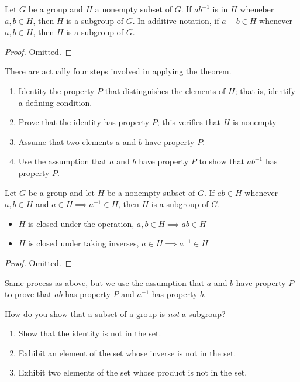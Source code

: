 \documentclass[12pt]{scrartcl}
\begin{document}
\begin{theorem}
  Let $G$ be a group and $H$ a nonempty subset of $G$. If $ab^{-1}$ is in $H$ wheneber $a, b \in H$, then $H$ is a subgroup 
  of $G$. In additive notation, if $a - b \in H$ whenever $a, b \in H$, then $H$ is a subgroup of $G$. 
  \begin{proof}
    Omitted.
  \end{proof} 
  There are actually four steps involved in applying the theorem. 
  \begin{enumerate}
    \item Identity the property $P$ that distinguishes the elements of $H$; that is, identify a defining condition. 
    \item Prove that the identity has property $P$; this verifies that $H$ is nonempty
    \item Assume that two elements $a$ and $b$ have property $P$. 
    \item Use the assumption that $a$ and $b$ have property $P$ to show that $ab^{-1}$ has property $P$. 
  \end{enumerate} 
\end{theorem}

\begin{theorem}
  Let $G$ be a group and let $H$ be a nonempty subset of $G$. If $ab \in H$ whenever $a, b \in H$
  and $a \in H \implies a^{-1} \in H$, then $H$ is a subgroup of $G$. 
  \begin{itemize}
    \item $H$ is closed under the operation, $a, b \in H \implies ab \in H$
    \item $H$ is closed under taking inverses, $a \in H \implies a^{-1} \in H$
  \end{itemize} 
  \begin{proof}
    Omitted.
  \end{proof}
  Same process as above, but we use the assumption that $a$ and $b$ have property $P$ to prove that $ab$ has property $P$ and $a^{-1}$ has property $b$. 
\end{theorem}

\begin{note}
How do you show that a subset of a group is \textit{not} a subgroup?
\begin{enumerate}
  \item Show that the identity is not in the set. 
  \item Exhibit an element of the set whose inverse is not in the set.
  \item Exhibit two elements of the set whose product is not in the set. 
\end{enumerate}
\end{note}
\end{document}
